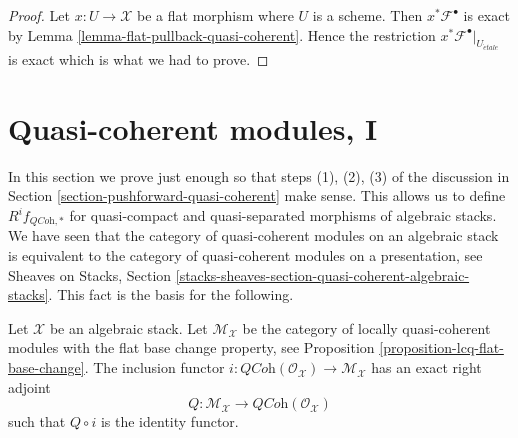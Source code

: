 \begin{proof}
Let $x : U \to \mathcal{X}$ be a flat morphism where $U$ is a scheme.
Then $x^*\mathcal{F}^\bullet$ is exact by
Lemma \ref{lemma-flat-pullback-quasi-coherent}.
Hence the restriction $x^*\mathcal{F}^\bullet|_{U_{\acute{e}tale}}$
is exact which is what we had to prove.
\end{proof}





\section{Quasi-coherent modules, I}
\label{section-quasi-coherent}

\noindent
In this section we prove just enough so that steps (1), (2), (3)
of the discussion in
Section \ref{section-pushforward-quasi-coherent}
make sense. This allows us to define $R^if_{\textit{QCoh}, *}$
for quasi-compact and quasi-separated morphisms of algebraic stacks.
We have seen that the category of quasi-coherent modules on an algebraic stack
is equivalent to the category of quasi-coherent modules on a presentation, see
Sheaves on Stacks, Section
\ref{stacks-sheaves-section-quasi-coherent-algebraic-stacks}.
This fact is the basis for the following.

\begin{lemma}
\label{lemma-adjoint}
Let $\mathcal{X}$ be an algebraic stack. Let $\mathcal{M}_\mathcal{X}$
be the category of locally quasi-coherent modules with the
flat base change property, see
Proposition \ref{proposition-lcq-flat-base-change}.
The inclusion functor
$i : \textit{QCoh}(\mathcal{O}_\mathcal{X}) \to \mathcal{M}_\mathcal{X}$
has an exact right adjoint
$$
Q : \mathcal{M}_\mathcal{X} \to \textit{QCoh}(\mathcal{O}_\mathcal{X})
$$
such that $Q \circ i$ is the identity functor.
\end{lemma}

